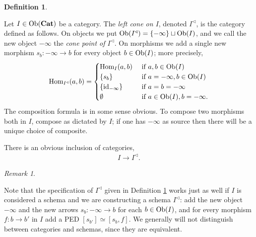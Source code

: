 \documentclass{book}
\def\tn{\textnormal}
\def\Hom{\tn{Hom}}
\def\Ob{\tn{Ob}}
\def\lcone{^\triangleleft}
\def\to{\rightarrow}
\def\taking{\colon}
\def\id{\tn{id}}
\def\Cat{{\bf Cat}}
\theoremstyle{remark}
\newtheorem{remark}[subsubsection]{Remark}
\theoremstyle{definition}
\newtheorem{definition}[subsubsection]{Definition}
\begin{document}
\begin{definition}\label{def:lcone}

Let $I\in\Ob(\Cat)$ be a category. The {\em left cone on $I$}, denoted $I\lcone$\index{a symbol!$\lcone$}, is the category defined as follows. On objects we put $\Ob(I\lcone)=\{-\infty\}\sqcup\Ob(I)$, and we call the new object $-\infty$ the {\em cone point of $I\lcone$}. On morphisms we add a single new morphism $s_b\taking-\infty\to b$ for every object $b\in\Ob(I)$; more precisely,
$$\Hom_{I\lcone}(a,b)=
\begin{cases}
\Hom_I(a,b)&\tn{ if }a,b\in\Ob(I)\\
\{s_b\}&\tn{ if }a=-\infty, b\in\Ob(I)\\
\{\id_{-\infty}\}&\tn{ if } a=b=-\infty\\
\emptyset&\tn{ if } a\in\Ob(I), b=-\infty.
\end{cases}$$
The composition formula is in some sense obvious. To compose two morphisms both in $I$, compose as dictated by $I$; if one has $-\infty$ as source then there will be a unique choice of composite.

There is an obvious inclusion of categories,
\begin{align}\label{dia:inclusion into cone}
I\to I\lcone.
\end{align}

\end{definition}

\begin{remark}\label{rem:schemas are cats!}

Note that the specification of $I\lcone$ given in Definition \ref{def:lcone} works just as well if $I$ is considered a schema and we are constructing a schema $I\lcone$: add the new object $-\infty$ and the new arrows $s_b\taking-\infty\to b$ for each $b\in\Ob(I)$, and for every morphism $f\taking b\to b'$ in $I$ add a PED $[s_{b'}]\simeq[s_b,f]$. We generally will not distinguish between categories and schemas, since they are equivalent.

\end{remark}
\end{document}
